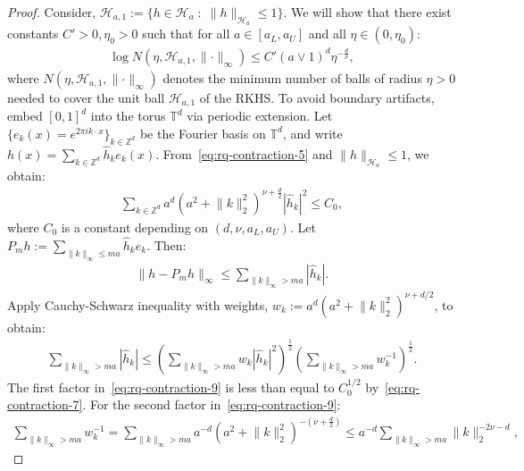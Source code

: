 \documentclass[final,12pt]{colt2026} %
\begin{document}
\begin{proof}
Consider, $\mathcal{H}_{a, 1}:= \{h\in \mathcal{H}_a\;:\; \lVert h\rVert_{\mathcal{H}_a} \leq 1\}$. We will show that there exist constants $C'>0, \eta_0>0$ such that for all $a\in [a_L, a_U]$ and all $\eta\in (0, \eta_0)$:
\begin{align}
\label{eq:rq-contraction-6}
\log N(\eta, \mathcal{H}_{a, 1}, \lVert \cdot \rVert_{\infty}) \leq C'(a\vee 1)^{d}\eta^{-\frac{d}{\nu}},
\end{align}
where $N(\eta, \mathcal{H}_{a, 1}, \lVert \cdot \rVert_{\infty})$ denotes the minimum number of balls of radius $\eta>0$ needed to cover the unit ball $\mathcal{H}_{a, 1}$ of the RKHS. To avoid boundary artifacts, embed $[0, 1]^{d}$ into the torus $\mathbb{T}^{d}$ via periodic extension. Let $\{e_k(x) = e^{2\pi i k\cdot x}\}_{k\in \mathbb{Z}^{d}}$ be the Fourier basis on $\mathbb{T}^{d}$, and write $h(x) = \sum_{k\in \mathbb Z^{d}}\widehat{h}_k e_k(x)$. From~\eqref{eq:rq-contraction-5} and $\lVert h\rVert_{\mathcal{H}_a} \leq 1$, we obtain:
\begin{align}
\label{eq:rq-contraction-7}
\sum_{k\in \mathbb Z^{d}}a^{d}\left(a^{2} + \lVert k\rVert_{2}^{2}\right)^{\nu + \frac{d}{2}}|\widehat{h}_k|^{2} \leq C_0,
\end{align}
where $C_0$ is a constant depending on $(d, \nu, a_L, a_U)$. Let $P_m h:= \sum_{\lVert k \rVert_{\infty}\leq m a}\widehat{h}_k e_k$. Then:
\begin{align}
\label{eq:rq-contraction-8}
\lVert h - P_m h\rVert_{\infty} \leq \sum_{\lVert k \rVert_{\infty} > ma} |\widehat{h}_k|.
\end{align}
Apply Cauchy-Schwarz inequality with weights, $w_k := a^{d}(a^{2} + \lVert k \rVert_{2}^{2})^{\nu + d/2}$, to obtain:
\begin{align}
\label{eq:rq-contraction-9}
\sum_{\lVert k \rVert_{\infty} > ma}|\widehat{h}_k| \leq \left(\sum_{\lVert k \rVert_{\infty} > ma}w_k|\widehat{h}_k|^2\right)^{\frac{1}{2}} \left(\sum_{\lVert k \rVert_{\infty}>ma} w_k^{-1}\right)^{\frac{1}{2}}.
\end{align}
The first factor in~\eqref{eq:rq-contraction-9} is less than equal to $C_0^{1/2}$ by~\eqref{eq:rq-contraction-7}. For the second factor in~\eqref{eq:rq-contraction-9}:
\begin{align}
\label{eq:rq-contraction-10}
\sum_{\lVert k \rVert_{\infty} > ma}w_k^{-1} = \sum_{\lVert k \rVert_{\infty} > ma}a^{-d}\left(a^{2} + \lVert k \rVert_{2}^{2}\right)^{-(\nu + \frac{d}{2})} \leq a^{-d} \sum_{\lVert k\rVert_{\infty}> ma} \lVert k \rVert_{2}^{-2\nu - d},
\end{align}

\end{proof}
\end{document}
